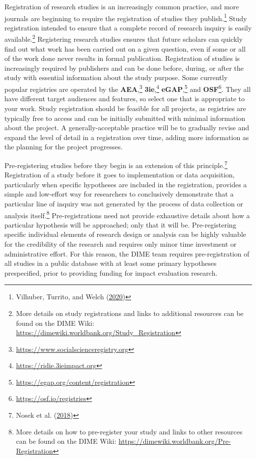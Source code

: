 \documentclass[
]{book}
\begin{document}
Registration of research studies is an increasingly common practice,
and more journals are beginning to require
the registration of studies they publish.\footnote{Vilhuber, Turrito, and Welch (\protect\hyperlink{ref-vilhuber2020report}{2020})}
Study registration intended to ensure that a complete record of research inquiry is easily available.\footnote{More details on study registrations and
  links to additional resources can be found on the DIME Wiki:
  \url{https://dimewiki.worldbank.org/Study_Registration}}
Registering research studies ensures that future scholars can quickly
find out what work has been carried out on a given question,
even if some or all of the work done never results in formal publication.
Registration of studies is increasingly required by publishers
and can be done before, during, or after the study
with essential information about the study purpose.
Some currently popular registries are operated by the
\textbf{AEA},\footnote{\url{https://www.socialscienceregistry.org}}
\textbf{3ie},\footnote{\url{https://ridie.3ieimpact.org}}
\textbf{eGAP},\footnote{\url{https://egap.org/content/registration}}
and \textbf{OSF}\footnote{\url{https://osf.io/registries}}.
They all have different target audiences and features,
so select one that is appropriate to your work.
Study registration should be feasible for all projects,
as registries are typically free to access and can be initially submitted with minimal information about the project.
A generally-acceptable practice will be to gradually revise and expand the level of detail in a registration over time,
adding more information as the planning for the project progresses.

Pre-registering studies before they begin is an extension of this principle.\footnote{Nosek et al. (\protect\hyperlink{ref-nosek2018preregistration}{2018})}
Registration of a study before it goes to implementation or data acquisition,
particularly when specific hypotheses are included in the registration,
provides a simple and low-effort way for researchers
to conclusively demonstrate that a particular line of inquiry
was not generated by the process of data collection or analysis itself.\footnote{More details on how to pre-register your study
  and links to other resources can be found on the DIME Wiki:
  \url{https://dimewiki.worldbank.org/Pre-Registration}}
Pre-registrations need not provide exhaustive details about how
a particular hypothesis will be approached; only that it will be.
Pre-registering specific individual elements of research design or analysis
can be highly valuable for the credibility of the research
and requires only minor time investment or administrative effort.
For this reason, the DIME team requires pre-registration of all studies
in a public database with at least some primary hypotheses prespecified,
prior to providing funding for impact evaluation research.
\end{document}
